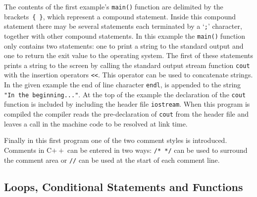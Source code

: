\documentclass[11pt,a4paper]{scrartcl}
\def\cpp{C$++\;$}
\def\main{\texttt{main()}$\;$}
\begin{document}
The contents of the first example's \main function are delimited by
the brackets~\texttt{\{~\}}, which represent a compound statement.
Inside this compound statement there may be several statements each
terminated by a `\texttt{;}' character, together with other compound
statements.  In this example the \main function only contains two
statements: one to print a string to the standard output and one to
return the exit value to the operating system.  The first of these
statements prints a string to the screen by calling the standard
output stream function \texttt{cout} with the insertion operators
\texttt{<<}.  This operator can be used to concatenate strings.  In
the given example the end of line character \texttt{endl}, is appended
to the string \texttt{"In the beginning..."}.  At the top of the
example the declaration of the \texttt{cout} function is included by
including the header file \texttt{iostream}.  When this program is
compiled the compiler reads the pre-declaration of \texttt{cout} from
the header file and leaves a call in the machine code to be resolved
at link time.

Finally in this first program one of the two comment styles is
introduced.  Comments in \cpp can be entered in two ways: 
\texttt{/* */} can be used to surround the comment area or 
\texttt{//} can be used at the start of each comment line.


\subsection{Loops, Conditional Statements and Functions}
\end{document}
